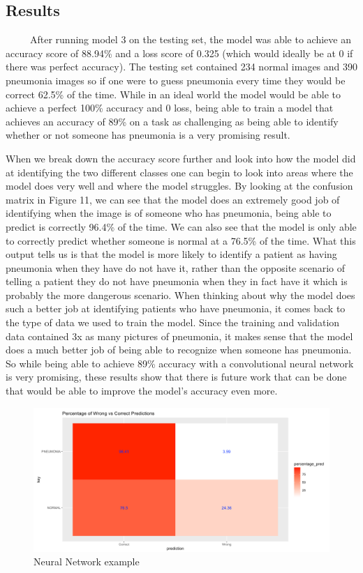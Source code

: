 \documentclass[12pt]{article}
\begin{document}
\hypertarget{results}{%
\subsection{Results}\label{results}}

~~~~~After running model 3 on the testing set, the model was able to
achieve an accuracy score of 88.94\% and a loss score of 0.325 (which
would ideally be at 0 if there was perfect accuracy). The testing set
contained 234 normal images and 390 pneumonia images so if one were to
guess pneumonia every time they would be correct 62.5\% of the time.
While in an ideal world the model would be able to achieve a perfect
100\% accuracy and 0 loss, being able to train a model that achieves an
accuracy of 89\% on a task as challenging as being able to identify
whether or not someone has pneumonia is a very promising result.

When we break down the accuracy score further and look into how the
model did at identifying the two different classes one can begin to look
into areas where the model does very well and where the model struggles.
By looking at the confusion matrix in Figure 11, we can see that the
model does an extremely good job of identifying when the image is of
someone who has pneumonia, being able to predict is correctly 96.4\% of
the time. We can also see that the model is only able to correctly
predict whether someone is normal at a 76.5\% of the time. What this
output tells us is that the model is more likely to identify a patient
as having pneumonia when they have do not have it, rather than the
opposite scenario of telling a patient they do not have pneumonia when
they in fact have it which is probably the more dangerous scenario. When
thinking about why the model does such a better job at identifying
patients who have pneumonia, it comes back to the type of data we used
to train the model. Since the training and validation data contained 3x
as many pictures of pneumonia, it makes sense that the model does a much
better job of being able to recognize when someone has pneumonia. So
while being able to achieve 89\% accuracy with a convolutional neural
network is very promising, these results show that there is future work
that can be done that would be able to improve the model's accuracy even
more.

\begin{figure}

{\centering \includegraphics[width=0.75\linewidth,height=0.25\textheight]{images/matrix} 

}

\caption{Neural Network example}\label{fig:sample-fig11}
\end{figure}
\end{document}
